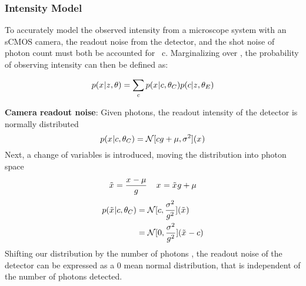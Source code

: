 \subsubsection{Intensity Model}

To accurately model the observed intensity from a microscope system with an sCMOS camera, 
  the readout noise from the detector, and the shot noise of photon count must both be accounted for~\cite{huang_video-rate_2013} c.
  Marginalizing over \photons, the probability of observing intensity \x{} can then be defined as:

  \begin{equation}
    p(x_{}|z_{},\theta) = \sum_c p(x_{}|c,\theta_C)p(c|z_{},\theta_E)
  \end{equation}

\textbf{Camera readout noise}:
  Given \photons photons, the readout intensity of the detector is normally distributed
  \begin{equation}
    p(x_{}|c,\theta_C) = \mathcal{N}[cg + \mu, \sigma^2](x_{})
  \end{equation}
  Next, a change of variables is introduced, moving the distribution into photon space
  \begin{equation}
    \tilde{x}_{} = \frac{x_{} - \mu}{g}
    \;\;\;\;
    x_{} = \tilde{x}_{}g + \mu
  \end{equation}
  \begin{align}
    p(\tilde{x}_{}|c,\theta_C)
      &= \mathcal{N}[c, \frac{\sigma^2}{g^2}](\tilde{x}_{}) \\
      &= \mathcal{N}[0, \frac{\sigma^2}{g^2}](\tilde{x}_{} - c)
  \end{align}
  Shifting our distribution by the number of photons \photons, the readout noise of the detector can be expressed as a 0 mean 
  normal distribution, that is independent of the number of photons detected.

